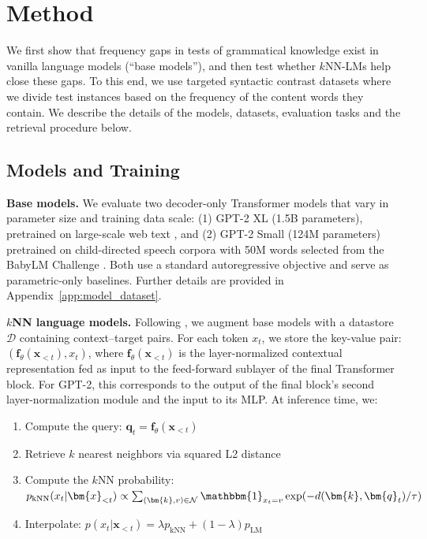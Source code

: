 \section{Method}
\label{sec:method}

We first show that frequency gaps in tests of grammatical knowledge exist in vanilla language models (``base models''), and then test whether $k$NN-LMs help close these gaps. To this end, we use targeted syntactic contrast datasets where we divide test instances based on the frequency of the content words they contain. We describe the details of the models, datasets, evaluation tasks and the retrieval procedure below. 

\subsection{Models and Training}

\noindent \textbf{Base models.} We evaluate two decoder-only Transformer models that vary in parameter size and training data scale: (1) GPT-2 XL (1.5B parameters), pretrained on large-scale web text \citep{radford2019language}, and (2) GPT-2 Small (124M parameters) pretrained on child-directed speech corpora with 50M words selected from the BabyLM Challenge \citep{hu2024findings}. Both use a standard autoregressive objective and serve as parametric-only baselines. Further details are provided in Appendix~\ref{app:model_dataset}.


\noindent \textbf{$k$NN language models.} Following \citet{khandelwal2020knnlm}, we augment base models with a datastore $\mathcal{D}$ containing context--target pairs. For each token $x_t$, we store the key-value pair: $(\bm{f}_\theta(\bm{x}_{<t}), x_t)$, where $\bm{f}_\theta(\bm{x}_{<t})$ is the layer-normalized contextual
representation fed as input to the feed-forward sublayer of the final Transformer block. For GPT-2, this corresponds to the output of the final block's second layer-normalization module and the input to its MLP. At inference time, we:
\vspace{-0.2cm}
\begin{enumerate}[itemsep=0.1pt, parsep=0pt]
    \item Compute the query: $\bm{q}_t = \bm{f}_\theta(\bm{x}_{<t})$
    \item Retrieve $k$ nearest neighbors via squared L2 distance
    \item Compute the $k$NN probability: $p_{\text{kNN}}(x_t|\bm{x}_{<t}) \propto \sum_{(\bm{k},v) \in \mathcal{N}} \mathbbm{1}_{x_t=v} \exp(-d(\bm{k},\bm{q}_t)/\tau)$
    \item Interpolate: $p(x_t|\bm{x}_{<t}) = \lambda p_{\text{kNN}} + (1-\lambda) p_{\text{LM}}$
\end{enumerate}

